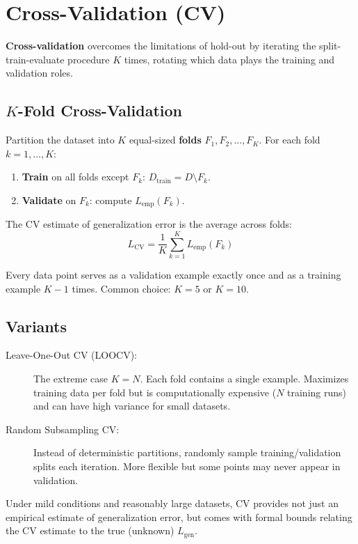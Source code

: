 \section*{Cross-Validation (CV)}

\textbf{Cross-validation} overcomes the limitations of hold-out by iterating the split-train-evaluate procedure $K$ times, rotating which data plays the training and validation roles.

\subsection*{$K$-Fold Cross-Validation}

\begin{definition}[$K$-Fold CV]
Partition the dataset into $K$ equal-sized \textbf{folds} $F_1, F_2, \ldots, F_K$. For each fold $k = 1, \ldots, K$:
\begin{enumerate}
    \item \textbf{Train} on all folds except $F_k$: $D_{\text{train}} = D \setminus F_k$.
    \item \textbf{Validate} on $F_k$: compute $L_{\text{emp}}(F_k)$.
\end{enumerate}
The CV estimate of generalization error is the average across folds:
$$L_{\text{CV}} = \frac{1}{K} \sum_{k=1}^{K} L_{\text{emp}}(F_k)$$
\end{definition}

Every data point serves as a validation example exactly once and as a training example $K-1$ times. Common choice: $K = 5$ or $K = 10$.

\subsection*{Variants}

\begin{description}
    \item[Leave-One-Out CV (LOOCV):] The extreme case $K = N$. Each fold contains a single example. Maximizes training data per fold but is computationally expensive ($N$ training runs) and can have high variance for small datasets.
    \item[Random Subsampling CV:] Instead of deterministic partitions, randomly sample training/validation splits each iteration. More flexible but some points may never appear in validation.
\end{description}

\begin{remark}
Under mild conditions and reasonably large datasets, CV provides not just an empirical estimate of generalization error, but comes with formal bounds relating the CV estimate to the true (unknown) $L_{\text{gen}}$.
\end{remark}

